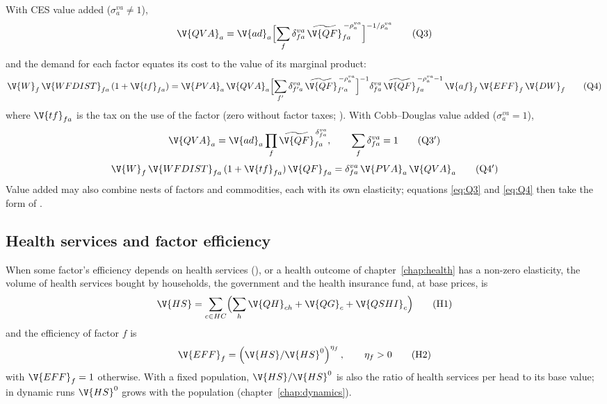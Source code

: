With CES value added ($\sigma^{va}_a \ne 1$),
\begin{equation}
\V{QVA}_a = \V{ad}_a\Bigl[\sum_f \delta^{va}_{fa}\,\widetilde{\V{QF}}_{fa}^{\,-\rho^{va}_a}\Bigr]^{-1/\rho^{va}_a}
\tag{Q3}\label{eq:Q3}
\end{equation}
and the demand for each factor equates its cost to the value of its marginal
product:
\begin{equation}
\V{W}_f\,\V{WFDIST}_{fa}\,(1 + \V{tf}_{fa}) = \V{PVA}_a\,\V{QVA}_a
  \Bigl[\sum_{f'} \delta^{va}_{f'a}\,\widetilde{\V{QF}}_{f'a}^{\,-\rho^{va}_a}\Bigr]^{-1}
  \delta^{va}_{fa}\,\widetilde{\V{QF}}_{fa}^{\,-\rho^{va}_a - 1}\,\V{af}_f\,\V{EFF}_f\,\V{DW}_f
\tag{Q4}\label{eq:Q4}
\end{equation}
where $\V{tf}_{fa}$ is the tax on the use of the factor (zero without factor
taxes; ). With Cobb--Douglas value added
($\sigma^{va}_a = 1$),
\begin{equation}
\V{QVA}_a = \V{ad}_a \prod_f \widetilde{\V{QF}}_{fa}^{\,\delta^{va}_{fa}},
\qquad \sum_f \delta^{va}_{fa} = 1
\tag{Q3$'$}\label{eq:Q3CD}
\end{equation}
\begin{equation}
\V{W}_f\,\V{WFDIST}_{fa}\,(1 + \V{tf}_{fa})\,\V{QF}_{fa} = \delta^{va}_{fa}\,\V{PVA}_a\,\V{QVA}_a
\tag{Q4$'$}\label{eq:Q4CD}
\end{equation}
Value added may also combine nests of factors and commodities, each with its
own elasticity; equations \eqref{eq:Q3} and \eqref{eq:Q4} then take the form
of .

\subsection{Health services and factor efficiency}

When some factor's efficiency depends on health services
(), or a health outcome of chapter~\ref{chap:health}
has a non-zero elasticity, the volume of health services bought by
households, the government and the health insurance fund, at base prices, is
\begin{equation}
\V{HS} = \sum_{c \in HC} \Bigl(\sum_h \V{QH}_{ch} + \V{QG}_c + \V{QSHI}_c\Bigr)
\tag{H1}\label{eq:H1}
\end{equation}
and the efficiency of factor $f$ is
\begin{equation}
\V{EFF}_f = \left(\V{HS} / \V{HS}^0\right)^{\eta_f}, \qquad \eta_f > 0
\tag{H2}\label{eq:H2}
\end{equation}
with $\V{EFF}_f = 1$ otherwise. With a fixed population, $\V{HS}/\V{HS}^0$ is
also the ratio of health services per head to its base value; in dynamic runs
$\V{HS}^0$ grows with the population (chapter~\ref{chap:dynamics}).

